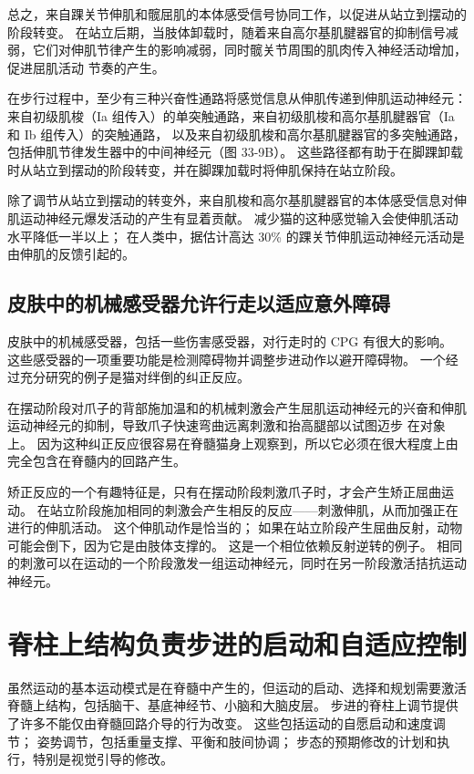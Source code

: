 总之，来自踝关节伸肌和髋屈肌的本体感受信号协同工作，以促进从站立到摆动的阶段转变。 在站立后期，当肢体卸载时，随着来自高尔基肌腱器官的抑制信号减弱，它们对伸肌节律产生的影响减弱，同时髋关节周围的肌肉传入神经活动增加，促进屈肌活动 节奏的产生。

在步行过程中，至少有三种兴奋性通路将感觉信息从伸肌传递到伸肌运动神经元：来自初级肌梭（Ia 组传入）的单突触通路，来自初级肌梭和高尔基肌腱器官（Ia 和 Ib 组传入）的突触通路， 以及来自初级肌梭和高尔基肌腱器官的多突触通路，包括伸肌节律发生器中的中间神经元（图 33-9B）。 这些路径都有助于在脚踝卸载时从站立到摆动的阶段转变，并在脚踝加载时将伸肌保持在站立阶段。

除了调节从站立到摆动的转变外，来自肌梭和高尔基肌腱器官的本体感受信息对伸肌运动神经元爆发活动的产生有显着贡献。 减少猫的这种感觉输入会使伸肌活动水平降低一半以上； 在人类中，据估计高达 30\% 的踝关节伸肌运动神经元活动是由伸肌的反馈引起的。

\subsection{皮肤中的机械感受器允许行走以适应意外障碍}
皮肤中的机械感受器，包括一些伤害感受器，对行走时的 CPG 有很大的影响。 这些感受器的一项重要功能是检测障碍物并调整步进动作以避开障碍物。 一个经过充分研究的例子是猫对绊倒的纠正反应。

在摆动阶段对爪子的背部施加温和的机械刺激会产生屈肌运动神经元的兴奋和伸肌运动神经元的抑制，导致爪子快速弯曲远离刺激和抬高腿部以试图迈步 在对象上。 因为这种纠正反应很容易在脊髓猫身上观察到，所以它必须在很大程度上由完全包含在脊髓内的回路产生。

矫正反应的一个有趣特征是，只有在摆动阶段刺激爪子时，才会产生矫正屈曲运动。 在站立阶段施加相同的刺激会产生相反的反应——刺激伸肌，从而加强正在进行的伸肌活动。 这个伸肌动作是恰当的； 如果在站立阶段产生屈曲反射，动物可能会倒下，因为它是由肢体支撑的。 这是一个相位依赖反射逆转的例子。 相同的刺激可以在运动的一个阶段激发一组运动神经元，同时在另一阶段激活拮抗运动神经元。


\section{脊柱上结构负责步进的启动和自适应控制}
虽然运动的基本运动模式是在脊髓中产生的，但运动的启动、选择和规划需要激活脊髓上结构，包括脑干、基底神经节、小脑和大脑皮层。 步进的脊柱上调节提供了许多不能仅由脊髓回路介导的行为改变。 这些包括运动的自愿启动和速度调节； 姿势调节，包括重量支撑、平衡和肢间协调； 步态的预期修改的计划和执行，特别是视觉引导的修改。


